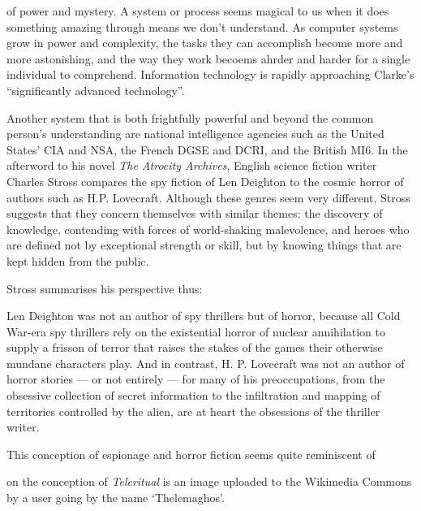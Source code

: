 \documentclass[a4paper,nobib]{tufte-handout}
\begin{document}
 of power and mystery. A system or process seems magical to us when it does something amazing through means we don't understand. As computer systems grow in power and complexity, the tasks they can accomplish become more and more astonishing, and the way they work becoems ahrder and harder for a single individual to comprehend. Information technology is rapidly approaching Clarke's ``significantly advanced technology''.

Another system that is both frightfully powerful and beyond the common person's understanding are national intelligence agencies such as the United States' CIA and NSA, the French DGSE and DCRI, and the British MI6. In the afterword to his novel \emph{The Atrocity Archives}, English science fiction writer Charles Stross compares the spy fiction of Len Deighton to the cosmic horror of authors such as H.P. Lovecraft. Although these genres seem very different, Stross suggests that they concern themselves with similar themes: the discovery of knowledge, contending with forces of world-shaking malevolence, and heroes who are defined not by exceptional strength or skill, but by knowing things that are kept hidden from the public.\autocite{stross2008}

Stross summarises his perspective thus:
\begin{displayquote}
    Len Deighton was not an author of spy thrillers but of horror, because all Cold War-era spy thrillers rely on the existential horror of nuclear annihilation to supply a frisson of terror that raises the stakes of the games their otherwise mundane characters play. And in contrast, H. P. Lovecraft was not an author of horror stories --- or not entirely --- for many of his preoccupations, from the obsessive collection of secret information to the infiltration and mapping of territories controlled by the alien, are at heart the obsessions of the thriller writer.\autocite{stross2008}
\end{displayquote}
This conception of espionage and horror fiction seems quite reminiscent of


 on the conception of \emph{Teleritual} is an image uploaded to the Wikimedia Commons by a user going by the name `Thelemaghos'.
\end{document}
